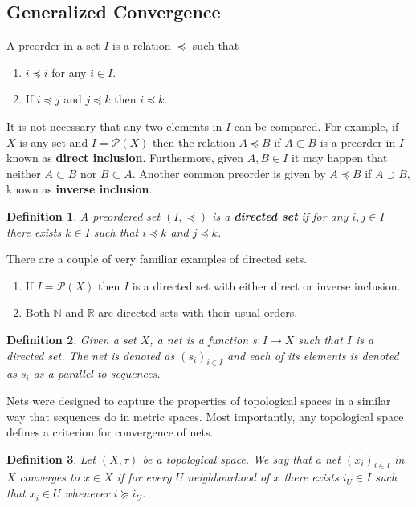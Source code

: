 \documentclass[%
 aip,
 amsmath,amssymb,
 reprint,%
jmp]{revtex4-2}
\newtheorem*{definition}{Definition}
\begin{document}
\subsection{Generalized Convergence}

A preorder in a set $I$ is a relation $\preceq$ such that
\begin{enumerate}
    \item $i\preceq i$ for any $i\in I$.
    \item If $i\preceq j$ and $j\preceq k$ then $i\preceq k$.
\end{enumerate}

It is not necessary that any two elements in $I$ can be compared. For example, if $X$ is any set and $I = \mathcal{P}(X)$ then the relation $A \preceq B$ if $A\subset B$ is a preorder in $I$ known as \textbf{direct inclusion}. Furthermore, given $A,B\in I$ it may happen that neither $A\subset B$ nor $B\subset A$. Another common preorder is given by $A\preceq B$ if $A\supset B$, known as \textbf{inverse inclusion}.

\begin{definition}
A preordered set $(I,\preceq)$ is a \textbf{directed set} if for any $i,j\in I$ there exists $k\in I$ such that $i\preceq k$ and $j\preceq k$.
\end{definition}

There are a couple of very familiar examples of directed sets.
\begin{enumerate}
    \item If $I = \mathcal{P}(X)$ then $I$ is a directed set with either direct or inverse inclusion.
    \item Both $\mathbb{N}$ and $\mathbb{R}$ are directed sets with their usual orders.
\end{enumerate}

\begin{definition}
Given a set $X$, a net is a function $s\colon I \to X$ such that $I$ is a directed set. The net is denoted as $(s_{i})_{i\in I}$ and each of its elements is denoted as $s_{i}$ as a parallel to sequences.
\end{definition}

Nets were designed to capture the properties of topological spaces in a similar way that sequences do in metric spaces. Most importantly, any topological space defines a criterion for convergence of nets.

\begin{definition}
Let $(X,\tau)$ be a topological space. We say that a net $(x_{i})_{i\in I}$ in $X$ converges to $x\in X$ if for every $U$ neighbourhood of $x$ there exists $i_{U}\in I$ such that $x_{i}\in U$ whenever $i \succeq i_{U}$.
\end{definition}
\end{document}
